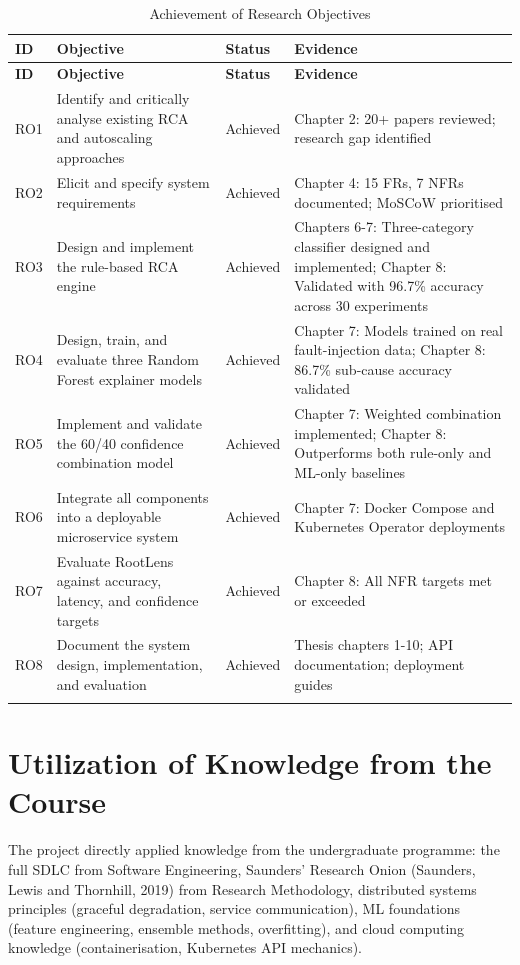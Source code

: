 \begin{xltabular}{\textwidth}{|p{1.5cm}|p{4cm}|p{2cm}|X|}

\hline
\textbf{ID} & \textbf{Objective} & \textbf{Status} & \textbf{Evidence} \\ \hline
\endfirsthead

\hline
\textbf{ID} & \textbf{Objective} & \textbf{Status} & \textbf{Evidence} \\ \hline
\endhead
RO1 & Identify and critically analyse existing RCA and autoscaling approaches & Achieved & Chapter 2: 20+ papers reviewed; research gap identified \\ \hline
RO2 & Elicit and specify system requirements & Achieved & Chapter 4: 15 FRs, 7 NFRs documented; MoSCoW prioritised \\ \hline
RO3 & Design and implement the rule-based RCA engine & Achieved & Chapters 6-7: Three-category classifier designed and implemented; Chapter 8: Validated with 96.7\% accuracy across 30 experiments \\ \hline
RO4 & Design, train, and evaluate three Random Forest explainer models & Achieved & Chapter 7: Models trained on real fault-injection data; Chapter 8: 86.7\% sub-cause accuracy validated \\ \hline
RO5 & Implement and validate the 60/40 confidence combination model & Achieved & Chapter 7: Weighted combination implemented; Chapter 8: Outperforms both rule-only and ML-only baselines \\ \hline
RO6 & Integrate all components into a deployable microservice system & Achieved & Chapter 7: Docker Compose and Kubernetes Operator deployments \\ \hline
RO7 & Evaluate RootLens against accuracy, latency, and confidence targets & Achieved & Chapter 8: All NFR targets met or exceeded \\ \hline
RO8 & Document the system design, implementation, and evaluation & Achieved & Thesis chapters 1-10; API documentation; deployment guides \\ \hline

\caption{Achievement of Research Objectives}
\label{tab:objectives_achieved}
\end{xltabular}

\section{Utilization of Knowledge from the Course}
The project directly applied knowledge from the undergraduate programme: the full SDLC from Software Engineering, Saunders' Research Onion (Saunders, Lewis and Thornhill, 2019) from Research Methodology, distributed systems principles (graceful degradation, service communication), ML foundations (feature engineering, ensemble methods, overfitting), and cloud computing knowledge (containerisation, Kubernetes API mechanics).

